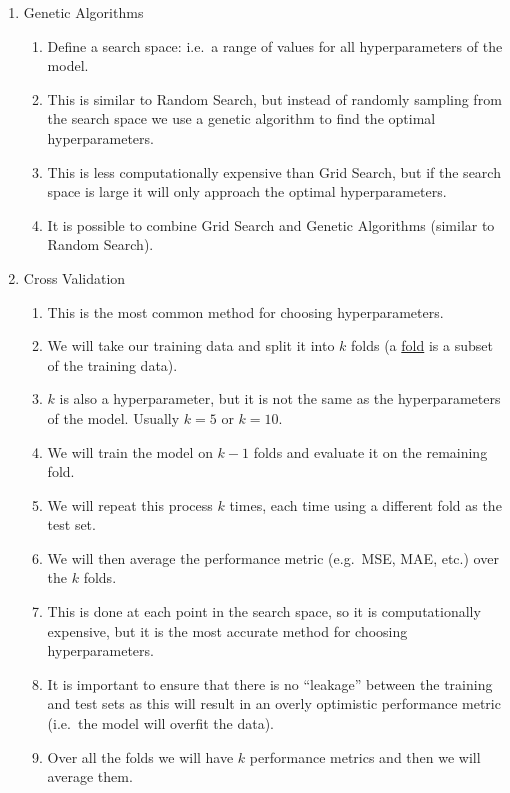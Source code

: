 \documentclass[12pt]{article}
\begin{document}
\begin{enumerate}
\begin{itemize}
                \end{itemize}
                \item Genetic Algorithms
                \begin{enumerate}
                    \item Define a search space: i.e.\ a range of values for all hyperparameters of the model.
                    \item This is similar to Random Search, but instead of randomly sampling from the search space we use a genetic algorithm to find the optimal hyperparameters.
                    \item This is less computationally expensive than Grid Search, but if the search space is large it will only approach the optimal hyperparameters.
                    \item It is possible to combine Grid Search and Genetic Algorithms (similar to Random Search).
                \end{enumerate}
                \item Cross Validation
                \begin{enumerate}
                    \item This is the most common method for choosing hyperparameters.
                    \item We will take our training data and split it into $k$ folds (a \underline{fold} is a subset of the training data).
                    \item $k$ is also a hyperparameter, but it is not the same as the hyperparameters of the model. Usually $k = 5$ or $k = 10$.
                    \item We will train the model on $k - 1$ folds and evaluate it on the remaining fold.
                    \item We will repeat this process $k$ times, each time using a different fold as the test set.
                    \item We will then average the performance metric (e.g.\ MSE, MAE, etc.) over the $k$ folds.
                    \item This is done at each point in the search space, so it is computationally expensive, but it is the most accurate method for choosing hyperparameters.
                    \item It is important to ensure that there is no ``leakage'' between the training and test sets as this will result in an overly optimistic performance metric (i.e.\ the model will overfit the data).
                    \item Over all the folds we will have $k$ performance metrics and then we will average them.
                \end{enumerate}
            \end{enumerate}
\end{document}
